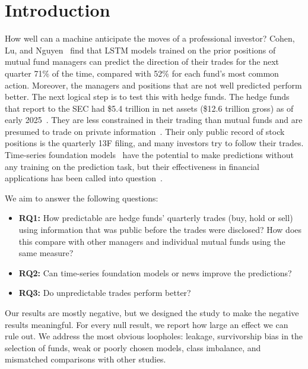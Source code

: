 \section{Introduction}

How well can a machine anticipate the moves of a professional investor?
Cohen, Lu, and Nguyen~\cite{cohen2026mimicking} find that LSTM models trained
on the prior positions of mutual fund managers can predict the direction of
their trades for the next quarter 71\% of the time, compared with 52\% for
each fund's most common action. Moreover, the managers and positions that are
not well predicted perform better. The next logical step is to test this with
hedge funds. The hedge funds that report to the SEC had \$5.4 trillion in net
assets (\$12.6 trillion gross) as of early 2025~\cite{sec2025pfstats}. They
are less constrained in their trading than mutual funds and are presumed to
trade on private information~\cite{agarwal2013hide, aragon2013confidential}.
Their only public record of stock positions is the quarterly 13F filing, and
many investors try to follow their trades. Time-series foundation
models~\cite{ansari2024chronos, ansari2025chronos2, das2024timesfm} have the
potential to make predictions without any training on the prediction task,
but their effectiveness in financial applications has been called into
question~\cite{rahimikia2025tsfm, noguer2026tsfm}.

We aim to answer the following questions:
\begin{itemize}
  \item \textbf{RQ1:} How predictable are hedge funds' quarterly trades (buy,
  hold or sell) using information that was public before the trades were
  disclosed? How does this compare with other managers and individual mutual
  funds using the same measure?
  \item \textbf{RQ2:} Can time-series foundation models or news improve the
  predictions?
  \item \textbf{RQ3:} Do unpredictable trades perform better?
\end{itemize}

Our results are mostly negative, but we designed the study to make the
negative results meaningful. For every null result, we report how large an
effect we can rule out. We address the most obvious loopholes: leakage,
survivorship bias in the selection of funds, weak or poorly chosen models,
class imbalance, and mismatched comparisons with other studies.

